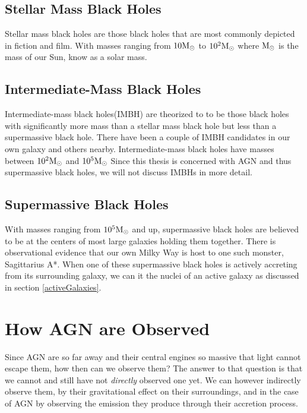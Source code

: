 \documentclass[12pt, oneside]{smuthesis}
\begin{document}
\subsection{\sc Stellar Mass Black Holes} \label{stellarBH}

Stellar mass black holes are those black holes that are most commonly depicted in fiction and film. With masses ranging from $10\textup{M}_{\odot}$ to $10^{2}\textup{M}_{\odot}$ where $\textup{M}_{\odot}$ is the mass of our Sun, know as a solar mass.

\subsection{\sc Intermediate-Mass Black Holes} \label{intermediateBH}

Intermediate-mass black holes(IMBH) are theorized to to be those black holes with significantly more mass than a stellar mass black hole but less than a supermassive black hole. There have been a couple of IMBH candidates in our own galaxy and others nearby. Intermediate-mass black holes have masses between $10^{2}\textup{M}_{\odot}$ and $10^{5}\textup{M}_{\odot}$ Since this thesis is concerned with AGN and thus supermassive black holes, we will not discuss IMBHs in more detail.

\subsection{\sc Supermassive Black Holes}

With masses ranging from $10^{5}\textup{M}_{\odot}$ and up, supermassive black holes are believed to be at the centers of most large galaxies holding them together. There is observational evidence that our own Milky Way is host to one such monster, Sagittarius A*. When one of these supermassive black holes is actively accreting from its surrounding galaxy, we can it the nuclei of an active galaxy as discussed in section \ref{activeGalaxies}.

\section{\sc How AGN are Observed} \label{howObserved}

Since AGN are so far away and their central engines so massive that light cannot escape them, how then can we observe them? The answer to that question is that we cannot and still have not \textit{directly} observed one yet. We can however indirectly observe them, by their gravitational effect on their surroundings, and in the case of AGN by observing the emission they produce through their accretion process.
\end{document}
